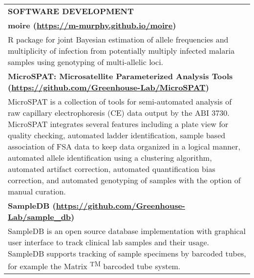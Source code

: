 \begin{center}
    \begin{tabularx}{\textwidth}{X}
        {\large \textbf{SOFTWARE DEVELOPMENT}} \\
        \small \textbf{moire (\href{https://m-murphy.github.io/moire/}{https://m-murphy.github.io/moire})} \\
        \small R package for joint Bayesian estimation of allele frequencies and multiplicity of infection from potentially multiply infected malaria samples using genotyping of multi-allelic loci. \\
        \small \textbf{MicroSPAT: Microsatellite Parameterized Analysis Tools (\href{https://github.com/Greenhouse-Lab/MicroSPAT}{https://github.com/Greenhouse-Lab/MicroSPAT})} \\
        \small MicroSPAT is a collection of tools for semi-automated analysis of raw capillary electrophoresis (CE) data output by the ABI 3730. MicroSPAT integrates several features including a plate view for quality checking, automated ladder identification, sample based association of FSA data to keep data organized in a logical manner, automated allele identification using a clustering algorithm, automated artifact correction, automated quantification bias correction, and automated genotyping of samples with the option of manual curation. \\
        \small \textbf{SampleDB (\href{https://github.com/Greenhouse-Lab/sample_db}{https://github.com/Greenhouse-Lab/sample\_db})} \\
        \small SampleDB is an open source database implementation with graphical user interface to track clinical lab samples and their usage. SampleDB supports tracking of sample specimens by barcoded tubes, for example the Matrix \textsuperscript{TM} barcoded tube system. \\
    \end{tabularx}
\end{center}
